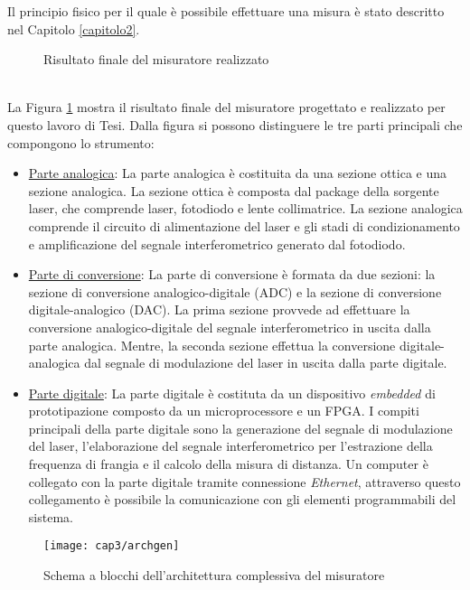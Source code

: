 Il principio fisico per il quale è possibile effettuare una misura è stato descritto nel Capitolo \ref{capitolo2}.
\begin{figure}  
  \begin{center}
    \caption{Risultato finale del misuratore realizzato}
    \label{fotorisfin}
  \end{center}
\end{figure}\\
La Figura \ref{fotorisfin} mostra il risultato finale del misuratore progettato e realizzato per questo lavoro di Tesi. Dalla figura si possono distinguere le tre parti principali che compongono lo strumento:
\begin{itemize}
	\item \underline{Parte analogica}: La parte analogica è costituita da una sezione ottica e una sezione analogica. La sezione ottica è composta dal package della sorgente laser, che comprende laser, fotodiodo e lente collimatrice. La sezione analogica comprende il circuito di alimentazione del laser e gli stadi di condizionamento e amplificazione del segnale interferometrico generato dal fotodiodo.
	\item \underline{Parte di conversione}: La parte di conversione è formata da due sezioni: la sezione di conversione analogico-digitale (ADC) e la sezione di conversione digitale-analogico (DAC). La prima sezione provvede ad effettuare la conversione analogico-digitale del segnale interferometrico in uscita dalla parte analogica. Mentre, la seconda sezione effettua la conversione digitale-analogica dal segnale di modulazione del laser in uscita dalla parte digitale.
	\item \underline{Parte digitale}: La parte digitale è costituta da un dispositivo \textit{embedded} di prototipazione composto da un microprocessore e un FPGA. I compiti principali della parte digitale sono la generazione del segnale di modulazione del laser, l'elaborazione del segnale interferometrico per l'estrazione della frequenza di frangia e il calcolo della misura di distanza. Un computer è collegato con la parte digitale tramite connessione \textit{Ethernet}, attraverso questo collegamento è possibile la comunicazione con gli elementi programmabili del sistema.
\end{itemize}
\begin{figure}  
  \begin{center}
    \texttt{[image: cap3/archgen]}
    \caption{Schema a blocchi dell'architettura complessiva del misuratore}
    \label{archgen}
  \end{center}
\end{figure}

